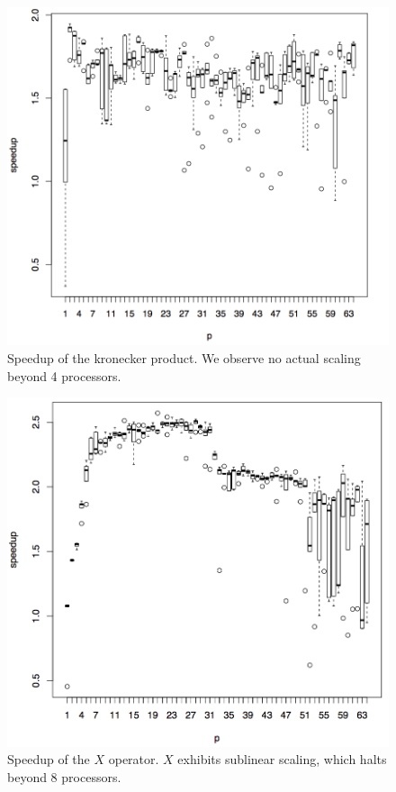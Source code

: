 \documentclass[a4paper,11pt, oneside]{report}
\begin{document}
\begin{figure}[hbp]
	\centering
	\includegraphics[width=\columnwidth]{kronecker.png}
	\caption{Speedup of the kronecker product. We observe no actual scaling beyond 4 processors.}
\end{figure}

\begin{figure}[p]
	\centering
	\includegraphics[width=\columnwidth]{sigma-x.png}
	\caption{Speedup of the $X$ operator. $X$ exhibits sublinear scaling, which halts beyond 8 processors.}
\end{figure}
\end{document}
